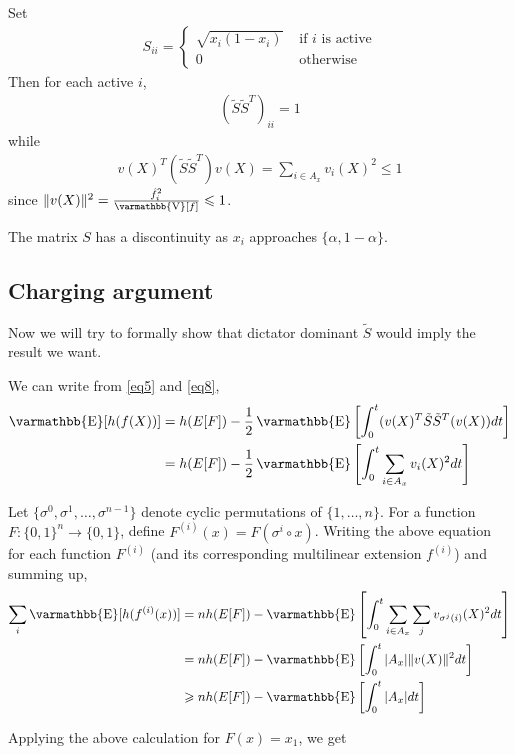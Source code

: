 \documentclass
[12pt,letterpaper]
{article}
\theoremstyle{definition}
\theoremstyle{remark}
\let\mathbb\varmathbb
\newcommand{\norm}[1]{\lVert#1\rVert}
\newcommand{\Esymb}{\mathbb{E}}
\newcommand{\Vsymb}{\mathbb{V}}
\DeclareMathOperator*{\E}{\Esymb}
\DeclareMathOperator*{\Var}{\Vsymb}
\newcommand{\bits}{\{0,1\}}
\renewcommand{\leq}{\leqslant}
\renewcommand{\geq}{\geqslant}
\numberwithin{equation}{section}
\begin{document}
Set 
\begin{align*}
S_{ii} = \begin{cases} \sqrt{x_i(1-x_i)} & \text{ if $i$ is active} \\
			0 & \text{ otherwise }
			\end{cases}
\end{align*}
Then for each active $i$,
\begin{align*}
(\tilde{S} \tilde{S}^T)_{ii} = 1
\end{align*}
while 
\begin{align} \label{eq8}
v(X)^T (\tilde{S} \tilde{S}^T) v(X) = \sum_{i \in A_x} v_i(X)^2 \leq 1
\end{align}
since $\norm{v(X)}^2 = \frac{\hat{f}_i^2}{\Var[f]}  \leq 1$.

The matrix $S$ has a discontinuity as $x_i$ approaches $\{\alpha,1-\alpha\}$.   


\subsection{Charging argument}

Now we will try to formally show that dictator dominant $\tilde{S}$ would imply the result we want.

We can write from \eqref{eq5} and \eqref{eq8},
\begin{align} 
\E[h(f(X))] & = h(E[F]) - \frac{1}{2} \E \left[ \int_0^t  (v(X)^T \tilde{S} \tilde{S}^T (v(X)) dt\right] \nonumber \\
			& = h(E[F]) - \frac{1}{2} \E \left[ \int_0^t  \sum_{i \in A_x} v_i(X)^2 dt\right] \nonumber 
\end{align}

Let $\{\sigma^0, \sigma^1,\ldots,\sigma^{n-1}\}$ denote cyclic permutations of $\{1,\ldots,n\}$.  For a function $F : \bits^n \to \bits$, define $F^{(i)}(x) = F(\sigma^i \circ x)$.   Writing the above equation for each function $F^{(i)}$ (and its corresponding multilinear extension $f^{(i)}$) and summing up,
\begin{align}
\sum_i \E[h(f^{(i)}(x))] & = n h(E[F]) -  \E \left[ \int_0^t  \sum_{i \in A_x} \sum_{j} v_{\sigma^j(i)}(X)^2 dt\right] \nonumber\\
						 & = n h(E[F]) -  \E \left[ \int_0^t |A_x| \norm{v(X)}^2 dt \right] \nonumber\\
						 & \geq n h(E[F]) - \E \left[ \int_0^t |A_x| dt \right] \label{eq24}
\end{align}

Applying the above calculation for $F(x) = x_1$, we get 
\end{document}
